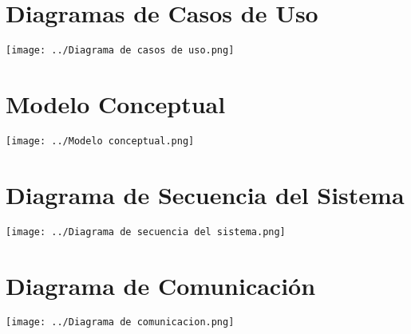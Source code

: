 \documentclass[12pt]{article}
\begin{document}
    \portada[%
    titulo=Fundamentos de Ingeniería del Software,
    subtitulo=Práctica 0,
    autor=Jesús Muñoz Velasco,
    imagen=../../../../../../_assets/Logo-UGR-Black.png,
    año=Curso 2024-2025]

    \tableofcontents

    \newpage

    \section{Diagramas de Casos de Uso}

    \begin{center}
        \texttt{[image: ../Diagrama de casos de uso.png]}
    \end{center}

    \section{Modelo Conceptual}

    \begin{center}
        \texttt{[image: ../Modelo conceptual.png]}
    \end{center}

    \section{Diagrama de Secuencia del Sistema}

    \begin{center}
        \texttt{[image: ../Diagrama de secuencia del sistema.png]}
    \end{center}

    \section{Diagrama de Comunicación}

    \begin{center}
        \texttt{[image: ../Diagrama de comunicacion.png]}
    \end{center}
\end{document}
